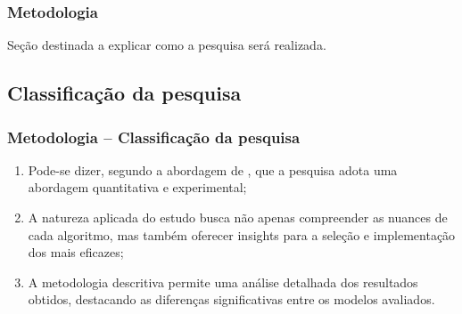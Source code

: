 \documentclass[aspectratio=169]{beamer}
\begin{document}
\begin{frame} \frametitle{Metodologia}
	\begin{center}
		Seção destinada a explicar como a pesquisa será realizada.
	\end{center}
\end{frame}


\subsection{Classificação da pesquisa}

\begin{frame}[fragile] \frametitle{Metodologia -- Classificação da pesquisa}
	\begin{enumerate}
		\item Pode-se dizer, segundo a abordagem de \textcite{pesquisa}, que a pesquisa adota uma abordagem quantitativa e experimental;
		
		\item A natureza aplicada do
    estudo busca não apenas compreender as nuances de cada algoritmo, mas também oferecer
    insights para a seleção e implementação dos mais eficazes;
		
		\item A metodologia descritiva permite
    uma análise detalhada dos resultados obtidos, destacando as diferenças significativas entre
    os modelos avaliados.
	\end{enumerate}
\end{frame}

\end{document}
